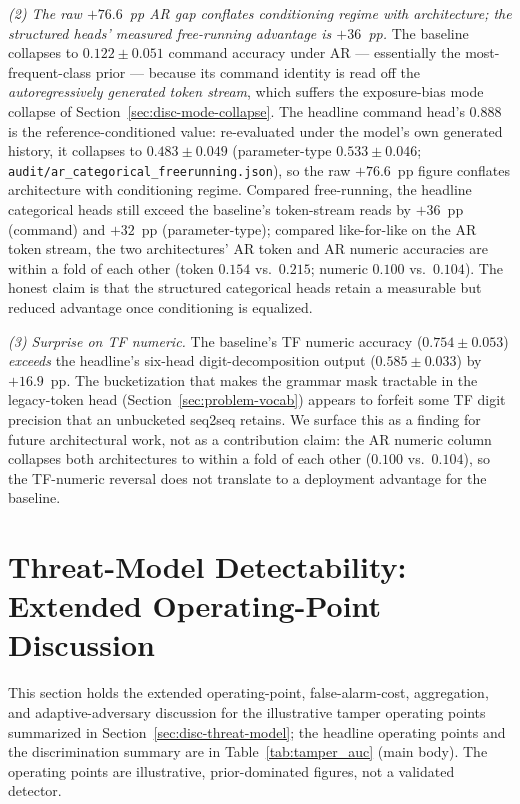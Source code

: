 \documentclass[11pt,a4paper]{article}
\begin{document}
\emph{(2) The raw $+76.6$~pp AR gap conflates conditioning regime with architecture; the structured heads' measured free-running advantage is $+36$~pp.} The baseline collapses to $0.122 \pm 0.051$ command accuracy under AR --- essentially the most-frequent-class prior --- because its command identity is read off the \emph{autoregressively generated token stream}, which suffers the exposure-bias mode collapse of Section~\ref{sec:disc-mode-collapse}. The headline command head's $0.888$ is the reference-conditioned value: re-evaluated under the model's own generated history, it collapses to $0.483 \pm 0.049$ (parameter-type $0.533 \pm 0.046$; \texttt{audit/ar\_categorical\_freerunning.json}), so the raw $+76.6$~pp figure conflates architecture with conditioning regime. Compared free-running, the headline categorical heads still exceed the baseline's token-stream reads by $+36$~pp (command) and $+32$~pp (parameter-type); compared like-for-like on the AR token stream, the two architectures' AR token and AR numeric accuracies are within a fold of each other (token $0.154$ vs.\ $0.215$; numeric $0.100$ vs.\ $0.104$). The honest claim is that the structured categorical heads retain a measurable but reduced advantage once conditioning is equalized.

\emph{(3) Surprise on TF numeric.} The baseline's TF numeric accuracy ($0.754 \pm 0.053$) \emph{exceeds} the headline's six-head digit-decomposition output ($0.585 \pm 0.033$) by $+16.9$~pp. The bucketization that makes the grammar mask tractable in the legacy-token head (Section~\ref{sec:problem-vocab}) appears to forfeit some TF digit precision that an unbucketed seq2seq retains. We surface this as a finding for future architectural work, not as a contribution claim: the AR numeric column collapses both architectures to within a fold of each other ($0.100$ vs.\ $0.104$), so the TF-numeric reversal does not translate to a deployment advantage for the baseline.

\section{Threat-Model Detectability: Extended Operating-Point Discussion}
\label{app:tamper-detail}

This section holds the extended operating-point, false-alarm-cost, aggregation,
and adaptive-adversary discussion for the illustrative tamper operating points
summarized in Section~\ref{sec:disc-threat-model}; the headline operating points
and the discrimination summary are in Table~\ref{tab:tamper_auc} (main body).
The operating points are illustrative, prior-dominated figures, not a validated
detector.
\end{document}
